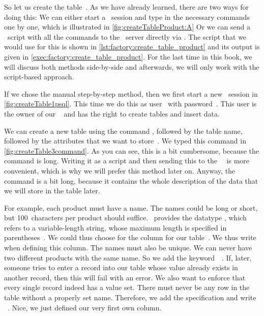 %
%
%
So let us create the table~.
As we have already learned, there are two ways for doing this:
We can either start a \psql\ session and type in the necessary commands one by one, which is illustrated in \cref{fig:createTableProduct:A}%
Or we can send a \sql\ script with all the commands to the \postgresql\ server directly via \psql.
The script that we would use for this is shown in \cref{lst:factory:create_table_product} and its output is given in \cref{exec:factory:create_table_product}.
For the last time in this book, we will discuss both methods side-by-side and afterwards, we will only work with the script-based approach.

If we chose the manual step-by-step method, then we first start a new \psql\ session in \cref{fig:createTable1psql}.
This time we do this as user~ with password~.
This user is the owner of our \db\  and has the right to create tables and insert data.

We can create a new table using the command , followed by the table name, followed by the attributes that we want to store~\cite{PGDG:PD:CT2}.
We typed this command in \cref{fig:createTable3command}.
As you can see, this is a bit cumbersome, because the command is long.
Writing it as a script and then sending this to the \postgresql\ \dbms\ is more convenient, which is why we will prefer this method later on.
Anyway, the command is a bit long, because it contains the whole description of the data that we will store in the table later.

For example, each product must have a name.
The names could be long or short, but 100~characters per product should suffice.
\sql\ provides the datatype , which refers to a variable-length string, whose maximum length is specified in parentheses~\cite{PGDG:PD:CT}.
We could thus choose  for the column  for our table~.
We thus write~ when defining this column.
The names must also be unique.
We can never have two different products with the same name.
So we add the keyword~~\cite{PGDG:PD:C}.
If, later, someone tries to enter a record into our table whose  value already exists in another record, then this will fail with an error.
We also want to enforce that every single record indeed has a  value set.
There must never be any row in the table without a properly set name.
Therefore, we add the  specification and write ~\cite{PGDG:PD:C}.
Nice, we just defined our very first own column.


